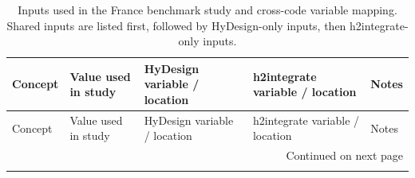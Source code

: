 
\begin{center}
\small
\setlength{\tabcolsep}{4pt}
\renewcommand{\arraystretch}{1.15}
\begin{longtable}{p{} p{} p{} p{} p{}}
\caption{Inputs used in the France benchmark study and cross-code variable mapping. Shared inputs are listed first, followed by HyDesign-only inputs, then h2integrate-only inputs.}\\
\toprule
Concept & Value used in study & HyDesign variable / location & h2integrate variable / location & Notes \\
\midrule
\endfirsthead

\toprule
Concept & Value used in study & HyDesign variable / location & h2integrate variable / location & Notes \\
\midrule
\endhead

\midrule
\multicolumn{5}{r}{Continued on next page} \\
\endfoot

\bottomrule
\endlastfoot


\end{longtable}
\end{center}

